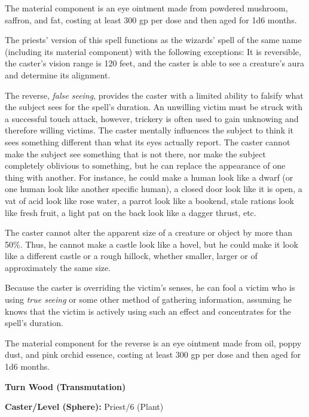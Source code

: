 \begin{multicols}{2}
The material component is an eye ointment made from powdered mushroom, saffron, and fat, costing at least 300 gp per dose and then aged for 1d6 months.

The priests' version of this spell functions as the wizards' spell of the same name (including its material component) with the following exceptions:  It is reversible, the caster's vision range is 120 feet, and the caster is able to see a creature's aura and determine its alignment.  

The reverse, \textit{false seeing}, provides the caster with a limited ability to falsify what the subject sees for the spell's duration.  An unwilling victim must be struck with a successful touch attack, however, trickery is often used to gain unknowing and therefore willing victims.  The caster mentally influences the subject to think it sees something different than what its eyes actually report.  The caster cannot make the subject see something that is not there, nor make the subject completely oblivious to something, but he can replace the appearance of one thing with another.  For instance, he could make a human look like a dwarf (or one human look like another specific human), a closed door look like it is open, a vat of acid look like rose water, a parrot look like a bookend, stale rations look like fresh fruit, a light pat on the back look like a dagger thrust, etc. 

The caster cannot alter the apparent size of a creature or object by more than 50\%. Thus, he cannot make a castle look like a hovel, but he could make it look like a different castle or a rough hillock, whether smaller, larger or of approximately the same size. 

Because the caster is overriding the victim's senses, he can fool a victim who is using \textit{true seeing} or some other method of gathering information, assuming he knows that the victim is actively using such an effect and concentrates for the spell's duration.

The material component for the reverse is an eye ointment made from oil, poppy dust, and pink orchid essence, costing at least 300 gp per dose and then aged for 1d6 months.

\vspace{1em}

\noindent
\begin{minipage}{\columnwidth}

\noindent \textbf{Turn Wood (Transmutation)}

\noindent \textbf{Caster/Level (Sphere):} Priest/6 (Plant)


\end{minipage}
\end{multicols}
